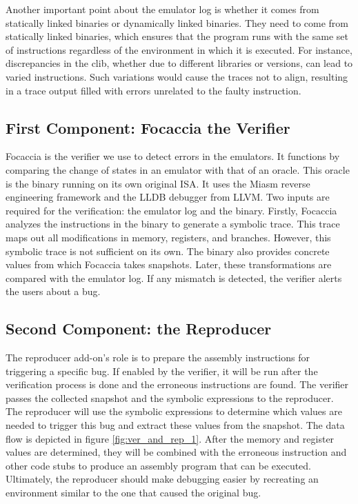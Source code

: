 Another important point about the emulator log is whether it comes from statically linked binaries or dynamically linked binaries.
They need to come from statically linked binaries, which ensures that the program runs with the same set of instructions regardless of the environment in which it is executed.
For instance, discrepancies in the \ac{clib}, whether due to different libraries or versions, can lead to varied instructions.
Such variations would cause the traces not to align, resulting in a trace output filled with errors unrelated to the faulty instruction.

\subsection{First Component: Focaccia the Verifier}

Focaccia is the verifier we use to detect errors in the emulators.
It functions by comparing the change of states in an emulator with that of an oracle.
This oracle is the binary running on its own original \ac{ISA}.
It uses the Miasm reverse engineering framework and the LLDB debugger from LLVM. 
Two inputs are required for the verification: the emulator log and the binary.
Firstly, Focaccia analyzes the instructions in the binary to generate a symbolic trace.
This trace maps out all modifications in memory, registers, and branches.
However, this symbolic trace is not sufficient on its own. 
The binary also provides concrete values from which Focaccia takes snapshots.
Later, these transformations are compared with the emulator log.
If any mismatch is detected, the verifier alerts the users about a bug.

\subsection{Second Component: the Reproducer}
The reproducer add-on's role is to prepare the assembly instructions for triggering a specific bug. 
If enabled by the verifier, it will be run after the verification process is done and the erroneous instructions are found.
The verifier passes the collected snapshot and the symbolic expressions to the reproducer.
The reproducer will use the symbolic expressions to determine which values are needed to trigger this bug and extract these values from the snapshot.
The data flow is depicted in figure \ref{fig:ver_and_rep_1}.
After the memory and register values are determined, they will be combined with the erroneous instruction and other code stubs to produce an assembly program that can be executed.
Ultimately, the reproducer should make debugging easier by recreating an environment similar to the one that caused the original bug.







